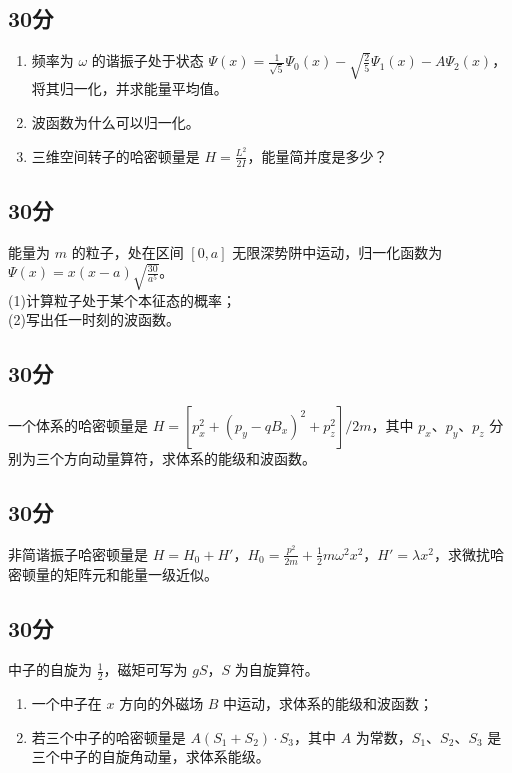 
\subsection{30分}
\begin{enumerate}
\item 频率为 $\omega$ 的谐振子处于状态 $\varPsi (x)=\frac{1}{\sqrt{5}}\varPsi_{0} (x)-\sqrt{\frac{2}{5}}\varPsi_{1} (x)-A\varPsi_2 (x)$，将其归一化，并求能量平均值。
\item 波函数为什么可以归一化。
\item 三维空间转子的哈密顿量是 $H=\frac{L^{2}}{2I}$，能量简并度是多少？
\end{enumerate}
\subsection{30分}
能量为 $m$ 的粒子，处在区间 $[0,a]$ 无限深势阱中运动，归一化函数为 $\varPsi (x)=x(x-a)\sqrt{\frac{30}{a^{5}}}$。\\
(1)计算粒子处于某个本征态的概率；\\
(2)写出任一时刻的波函数。
\subsection{30分}
一个体系的哈密顿量是 $H=[p^{2}_{x}+(p_{y}-qB_{x})^{2}+p^{2}_{z}]/2m$，其中 $p_{x}$、$p_{y}$、$p_{z}$ 分别为三个方向动量算符，求体系的能级和波函数。
\subsection{30分}
非简谐振子哈密顿量是 $H=H_{0}+H'$，$H_{0}=\frac{p^{2}}{2m}+\frac{1}{2}m\omega^{2}x^{2}$，$H'=\lambda x^{2}$，求微扰哈密顿量的矩阵元和能量一级近似。
\subsection{30分}
中子的自旋为 $\frac{1}{2}$，磁矩可写为 $gS$，$S$ 为自旋算符。
\begin{enumerate}
\item 一个中子在 $x$ 方向的外磁场 $B$ 中运动，求体系的能级和波函数；
\item 若三个中子的哈密顿量是 $A(S_{1}+S_{2})\cdot S_{3}$，其中 $A$ 为常数，$S_{1}$、$S_{2}$、$S_{3}$ 是三个中子的自旋角动量，求体系能级。
\end{enumerate}

